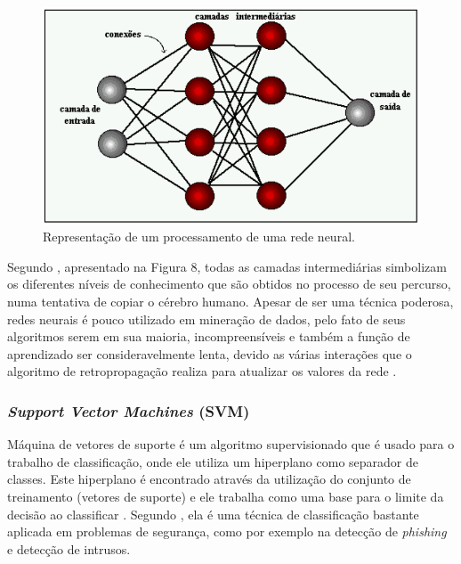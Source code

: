 \begin{figure}[!htp]
	\begin{center}
    \caption{\label{fig:waveform_fig} Representação de um processamento de uma rede neural.}
	\includegraphics[scale=0.56]{Figuras/Redes_neural.png}
	\end{center}
\end{figure}

\par
Segundo , apresentado na Figura 8, todas as camadas intermediárias simbolizam os diferentes níveis de conhecimento que são obtidos no processo de seu percurso, numa tentativa de copiar o cérebro humano. Apesar de ser uma técnica poderosa, redes neurais é pouco utilizado em mineração de dados, pelo fato de seus algoritmos serem em sua maioria, incompreensíveis e também a função de aprendizado ser consideravelmente lenta, devido as várias interações que o algoritmo de retropropagação realiza para atualizar os valores da rede \cite{Carvalho2014}. 



\subsubsection{\textit{Support Vector Machines} (SVM)}

\par
Máquina de vetores de suporte é um algoritmo supervisionado que é usado para o trabalho de classificação, onde ele utiliza um hiperplano como separador de classes. Este hiperplano é encontrado através da utilização do conjunto de treinamento (vetores de suporte) e ele trabalha como uma base para o limite da decisão ao classificar \cite{Costa2012}. Segundo , ela é uma técnica de classificação bastante aplicada em problemas de segurança, como por exemplo na detecção de \textit{phishing} e detecção de intrusos.

